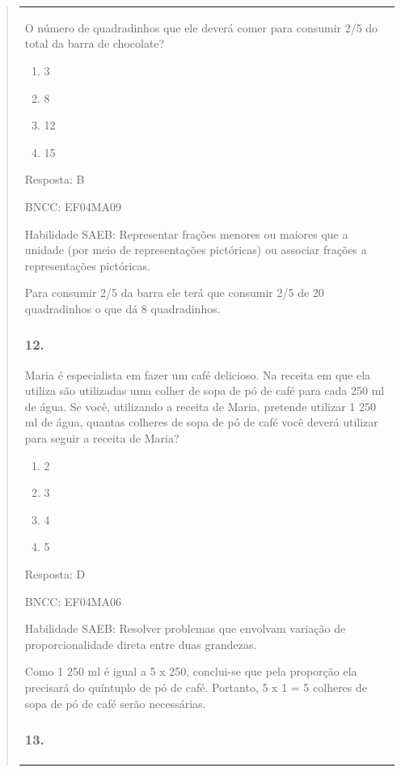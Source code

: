 \begin{enumerate}
\begin{escolha}
\begin{enumerate}
\begin{itemize}
\begin{itemize}
\begin{escolha}
\begin{quote}
\begin{escolha}
{\begin{longtable}[]{@{}l@{}}
\begin{itemize}
O número de quadradinhos que ele deverá comer para consumir 2/5 do total
da barra de chocolate?

\begin{enumerate}
\def\labelenumi{\alph{enumi})}
\item
  3
\item
  8
\item
  12
\item
  15
\end{enumerate}

Resposta: B

BNCC: EF04MA09

Habilidade SAEB: Representar frações menores ou maiores que a unidade
(por meio de representações pictóricas) ou associar frações a
representações pictóricas.

Para consumir 2/5 da barra ele terá que consumir 2/5 de 20 quadradinhos
o que dá 8 quadradinhos.

\subsubsection{12.}\label{section-168}

Maria é especialista em fazer um café delicioso. Na receita em que ela
utiliza são utilizadas uma colher de sopa de pó de café para cada 250 ml
de água. Se você, utilizando a receita de Maria, pretende utilizar 1 250
ml de água, quantas colheres de sopa de pó de café você deverá utilizar
para seguir a receita de Maria?

\begin{enumerate}
\def\labelenumi{\alph{enumi})}
\item
  2
\item
  3
\item
  4
\item
  5
\end{enumerate}

Resposta: D

BNCC: EF04MA06

Habilidade SAEB: Resolver problemas que envolvam variação de
proporcionalidade direta entre duas grandezas.

Como 1 250 ml é igual a 5 x 250, conclui-se que pela proporção ela
precisará do quíntuplo de pó de café. Portanto, 5 x 1 = 5 colheres de
sopa de pó de café serão necessárias.

\subsubsection{13.}\label{section-169}


\end{itemize}
\end{longtable}}
\end{escolha}
\end{quote}
\end{escolha}
\end{itemize}
\end{itemize}
\end{enumerate}
\end{escolha}
\end{enumerate}

